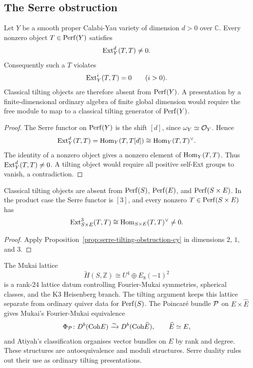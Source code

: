 \subsection*{The Serre obstruction}

\begin{proposition}
\label{prop:serre-tilting-obstruction-cy}
Let \(Y\) be a smooth proper Calabi-Yau variety of dimension \(d>0\)
over \(\mathbb C\).  Every nonzero object \(T\in\mathrm{Perf}(Y)\) satisfies
\[
  \mathrm{Ext}_Y^d(T,T)\neq 0.
\]
Consequently such a \(T\) violates
\[
  \mathrm{Ext}_Y^i(T,T)=0\qquad (i>0).
\]
Classical tilting objects are therefore absent from \(\mathrm{Perf}(Y)\).  A
presentation by a finite-dimensional ordinary algebra of finite global
dimension would require the free module to map to a classical tilting
generator of \(\mathrm{Perf}(Y)\).
\end{proposition}

\begin{proof}
The Serre functor on \(\mathrm{Perf}(Y)\) is the shift \([d]\), since
\(\omega_Y\simeq\mathcal{O}_Y\).  Hence
\[
  \mathrm{Ext}_Y^d(T,T)
  =
  \mathrm{Hom}_Y(T,T[d])
  \cong
  \mathrm{Hom}_Y(T,T)^\vee .
\]
The identity of a nonzero object gives a nonzero element of
\(\mathrm{Hom}_Y(T,T)\).  Thus \(\mathrm{Ext}_Y^d(T,T)\neq 0\).  A tilting object would
require all positive self-Ext groups to vanish, a contradiction.
\end{proof}

\begin{corollary}
\label{cor:k3-e-product-tilting-obstruction}
Classical tilting objects are absent from
\(\mathrm{Perf}(S)\), \(\mathrm{Perf}(E)\), and \(\mathrm{Perf}(S\times E)\).  In the product
case the Serre functor is \([3]\), and every nonzero
\(T\in\mathrm{Perf}(S\times E)\) has
\[
  \mathrm{Ext}^3_{S\times E}(T,T)\cong \mathrm{Hom}_{S\times E}(T,T)^\vee\neq 0 .
\]
\end{corollary}

\begin{proof}
Apply Proposition~\ref{prop:serre-tilting-obstruction-cy} in dimensions
\(2\), \(1\), and \(3\).
\end{proof}

The Mukai lattice
\[
  \widetilde H(S,\mathbb Z)\cong U^4\oplus E_8(-1)^2
\]
is a rank-\(24\) lattice datum controlling Fourier-Mukai symmetries,
spherical classes, and the K3 Heisenberg branch.  The tilting
argument keeps this lattice separate from ordinary quiver data for
\(\mathrm{Perf}(S)\).  The Poincar\'e bundle \(\mathcal{P}\) on
\(E\times\widehat E\) gives Mukai's Fourier-Mukai equivalence
\[
  \Phi_{\mathcal{P}}\colon D^b(\mathrm{Coh} E)\xrightarrow{\sim}D^b(\mathrm{Coh} \widehat E),
  \qquad \widehat E\simeq E,
\]
and Atiyah's classification organises vector bundles on \(E\) by
rank and degree.  These structures are autoequivalence and moduli
structures.  Serre duality rules out their use as ordinary tilting
presentations.

